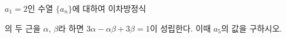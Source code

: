 $a_1=2$인 수열 $\{a_n\}$에 대하여 이차방정식 \par\smallskip{}\par\smallskip\noindent 의 두 근을 $\alpha$, $\beta$라 하면 $3\alpha-\alpha\beta+3\beta=1$이 성립한다. 이때 $a_5$의 값을 구하시오.
